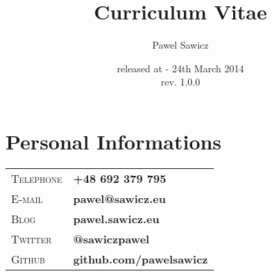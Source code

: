 \documentclass[a4paper, oneside, final]{article}
\title{Curriculum Vitae}
\author{Pawel Sawicz}
\date{released at - 24th March 2014 \\ rev. 1.0.0   }
\begin{document}
\maketitle

\section{Personal Informations }
\begin{center}
\begin{tabularx}{0.97\linewidth}{>{\raggedleft\scshape}p{2cm}X}
 Telephone & \textbf{+48 692 379 795}\\
 E-mail & \textbf{pawel@sawicz.eu}\\
 Blog & \textbf{pawel.sawicz.eu}\\
Twitter & \textbf{@sawiczpawel}\\
Github & \textbf{github.com/pawelsawicz}\\
\end{tabularx}
\end{center}
\end{document}
